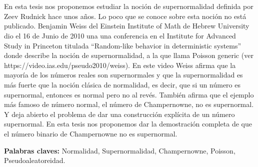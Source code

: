 \chapter*{\runtitulo}

\noindent En esta tesis nos proponemos estudiar la noción de supernormalidad definida por Zeev
Rudnick hace unos años. Lo poco que se conoce sobre esta noción no está publicado. Benjamin
Weiss del Einstein Institute of Math de Hebrew University dio el 16 de Junio de 2010 una una
conferencia en el Institute for Advanced Study in Princeton titulada “Random-like behavior
in deterministic systems” donde describe la noción de supernormalidad, a la que llama Poisson
generic (ver https://video.ias.edu/pseudo2010/weiss).
En este video Weiss afirma que la mayoría de los números reales son supernormales y que la supernormalidad es más fuerte que la noción clásica de normalidad, es decir, que si un número es supernormal, entonces es normal pero no al revés.
También afirma que el ejemplo más famoso de número normal, el número de Champernowne, no es supernormal. Y deja abierto
el problema de dar una construcción explícita de un número supernormal.
En esta tesis nos proponemos dar la demostración completa de que el número binario de
Champernowne no es supernormal.

\bigskip

\noindent\textbf{Palabras claves:} Normalidad, Supernormalidad, Champernowne, Poisson, Pseudoaleatoreidad.